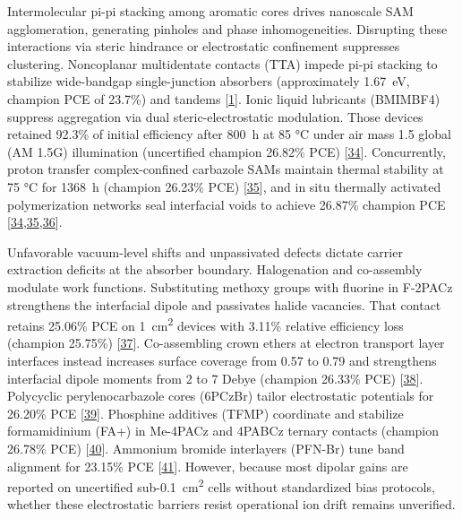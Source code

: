 \documentclass[
  11pt,
]{article}
\begin{document}
Intermolecular pi-pi stacking among aromatic cores drives nanoscale SAM
agglomeration, generating pinholes and phase inhomogeneities. Disrupting
these interactions via steric hindrance or electrostatic confinement
suppresses clustering. Noncoplanar multidentate contacts (TTA) impede
pi-pi stacking to stabilize wide-bandgap single-junction absorbers
(approximately \qty{1.67}{\electronvolt}, champion PCE of 23.7\%) and
tandems {[}\href{https://doi.org/10.1126/sciadv.aei2945}{1}{]}. Ionic
liquid lubricants (BMIMBF4) suppress aggregation via dual
steric-electrostatic modulation. Those devices retained 92.3\% of
initial efficiency after \qty{800}{\hour} at 85 °C under air mass 1.5
global (AM 1.5G) illumination (uncertified champion 26.82\% PCE)
{[}\href{https://doi.org/10.1002/anie.7090517}{34}{]}. Concurrently,
proton transfer complex-confined carbazole SAMs maintain thermal
stability at 75 °C for \qty{1368}{\hour} (champion 26.23\% PCE)
{[}\href{https://doi.org/10.1021/acsenergylett.6c01489}{35}{]}, and in
situ thermally activated polymerization networks seal interfacial voids
to achieve 26.87\% champion PCE
{[}\href{https://doi.org/10.1002/anie.7090517}{34},\href{https://doi.org/10.1021/acsenergylett.6c01489}{35},\href{https://doi.org/10.1002/anie.1018855}{36}{]}.

Unfavorable vacuum-level shifts and unpassivated defects dictate carrier
extraction deficits at the absorber boundary. Halogenation and
co-assembly modulate work functions. Substituting methoxy groups with
fluorine in F-2PACz strengthens the interfacial dipole and passivates
halide vacancies. That contact retains 25.06\% PCE on
\qty{1}{\centi\meter\squared} devices with 3.11\% relative efficiency
loss (champion 25.75\%)
{[}\href{https://doi.org/10.1002/adfm.76878}{37}{]}. Co-assembling crown
ethers at electron transport layer interfaces instead increases surface
coverage from 0.57 to 0.79 and strengthens interfacial dipole moments
from 2 to 7 Debye (champion 26.33\% PCE)
{[}\href{https://doi.org/10.1002/adma.73886}{38}{]}. Polycyclic
perylenocarbazole cores (6PCzBr) tailor electrostatic potentials for
26.20\% PCE {[}\href{https://doi.org/10.1002/anie.4031162}{39}{]}.
Phosphine additives (TFMP) coordinate  and stabilize
formamidinium (FA+) in Me-4PACz and 4PABCz ternary contacts (champion
26.78\% PCE) {[}\href{https://doi.org/10.1002/adma.74416}{40}{]}.
Ammonium bromide interlayers (PFN-Br) tune band alignment for 23.15\%
PCE {[}\href{https://doi.org/10.1002/smll.74806}{41}{]}. However,
because most dipolar gains are reported on uncertified
sub-\qty{0.1}{\centi\meter\squared} cells without standardized bias
protocols, whether these electrostatic barriers resist operational ion
drift remains unverified.
\end{document}
